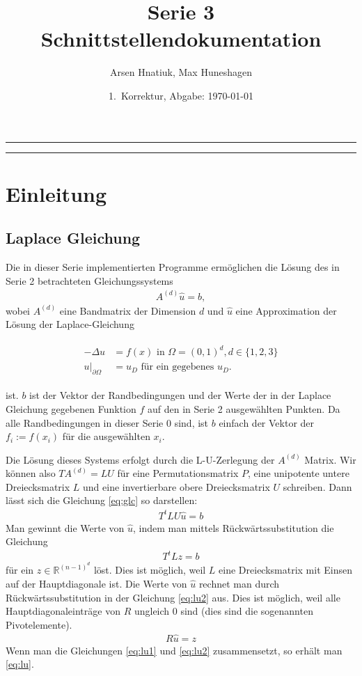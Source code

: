 \documentclass[letterpaper,10pt,ngerman, oneside, openright]{sphinxmanual}
\title{Serie 3 Schnittstellendokumentation}
\date{1.~Korrektur, Abgabe: \today}
\author{Arsen Hnatiuk, Max Huneshagen}
\begin{document}
\maketitle
\tableofcontents
\bigskip

\hrule
\hrule


\chapter{Einleitung}

\section{Laplace Gleichung}
Die in dieser Serie implementierten Programme ermöglichen die Lösung des in Serie 2 betrachteten Gleichungssystems
\begin{align}
A^{(d)}\hat{u} = b,
\label{eq:glc}
\end{align}
wobei $A^{(d)}$ eine Bandmatrix der Dimension $d$ und $\hat{u}$ eine Approximation der Lösung der Laplace-Gleichung

\begin{align}
\begin{split}
-\Delta u&=f(x)\text{ in }\Omega=(0, 1)^d, d\in\{1,2,3\}\\
u \vert _{\partial\Omega}&=u_D\text{ für ein gegebenes }u_D.
\end{split}
\label{eq:rwp}
\end{align}


ist. $b$ ist der Vektor der Randbedingungen und der Werte der in der Laplace Gleichung gegebenen Funktion $f$ auf den in Serie 2 ausgewählten Punkten. Da alle Randbedingungen in dieser Serie $0$ sind, ist $b$ einfach der Vektor der $f_i := f(x_i)$ für die ausgewählten $x_i$. 

Die Lösung dieses Systems erfolgt durch die L-U-Zerlegung der $A^{(d)}$ Matrix. Wir können also $TA^{(d)}=LU$ für eine Permutationsmatrix $P$, eine unipotente untere Dreiecksmatrix $L$ und eine invertierbare obere Dreiecksmatrix $U$ schreiben. Dann lässt sich die Gleichung \ref{eq:glc} so darstellen:
\begin{align}
T^tLU\hat{u}=b
\label{eq:lu}
\end{align}
Man gewinnt die Werte von $\hat{u}$, indem man mittels Rückwärtssubstitution die Gleichung 
\begin{align}
T^tLz=b
\label{eq:lu1}
\end{align}
für ein $z\in \mathbb{R}^{(n-1)^d}$ löst. Dies ist möglich, weil $L$ eine Dreiecksmatrix mit Einsen auf der Hauptdiagonale ist. Die Werte von $\hat{u}$ rechnet man durch Rückwärtssubstitution in der Gleichung \eqref{eq:lu2} aus. Dies ist möglich, weil alle Hauptdiagonaleinträge von $R$ ungleich $0$ sind (dies sind die sogenannten Pivotelemente).
\begin{align}
R\hat{u}=z
\label{eq:lu2}
\end{align}
Wenn man die Gleichungen \eqref{eq:lu1} und \eqref{eq:lu2} zusammensetzt, so erhält man \eqref{eq:lu}.
\end{document}
